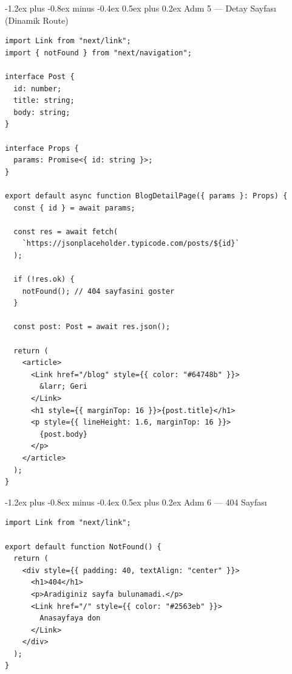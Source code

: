 \documentclass[12pt, a4paper]{article}
\makeatletter
\renewcommand{\subsection}{%
  \@startsection{subsection}{2}{\z@}%
    {-1.2ex plus -0.8ex minus -0.4ex}%
    {0.5ex plus 0.2ex}%
    {\normalfont\large\bfseries\sffamily\color{secondary}}%
}
\makeatother
\begin{document}
\newpage
\subsection{Adım 5 --- Detay Sayfası (Dinamik Route)}

\begin{tcolorbox}[enhanced, colback=codebg, colframe=gray!30,
    colbacktitle=routecol!85!black, coltitle=white, arc=4pt,
    title={\sffamily\bfseries\small src/app/blog/[id]/page.tsx}]
\begin{lstlisting}[style=jsxstyle]
import Link from "next/link";
import { notFound } from "next/navigation";

interface Post {
  id: number;
  title: string;
  body: string;
}

interface Props {
  params: Promise<{ id: string }>;
}

export default async function BlogDetailPage({ params }: Props) {
  const { id } = await params;

  const res = await fetch(
    `https://jsonplaceholder.typicode.com/posts/${id}`
  );

  if (!res.ok) {
    notFound(); // 404 sayfasini goster
  }

  const post: Post = await res.json();

  return (
    <article>
      <Link href="/blog" style={{ color: "#64748b" }}>
        &larr; Geri
      </Link>
      <h1 style={{ marginTop: 16 }}>{post.title}</h1>
      <p style={{ lineHeight: 1.6, marginTop: 16 }}>
        {post.body}
      </p>
    </article>
  );
}
\end{lstlisting}
\end{tcolorbox}

\subsection{Adım 6 --- 404 Sayfası}

\begin{tcolorbox}[enhanced, colback=codebg, colframe=gray!30,
    colbacktitle=danger!85!black, coltitle=white, arc=4pt,
    title={\sffamily\bfseries\small src/app/not-found.tsx}]
\begin{lstlisting}[style=jsxstyle]
import Link from "next/link";

export default function NotFound() {
  return (
    <div style={{ padding: 40, textAlign: "center" }}>
      <h1>404</h1>
      <p>Aradiginiz sayfa bulunamadi.</p>
      <Link href="/" style={{ color: "#2563eb" }}>
        Anasayfaya don
      </Link>
    </div>
  );
}
\end{lstlisting}
\end{tcolorbox}
\end{document}

